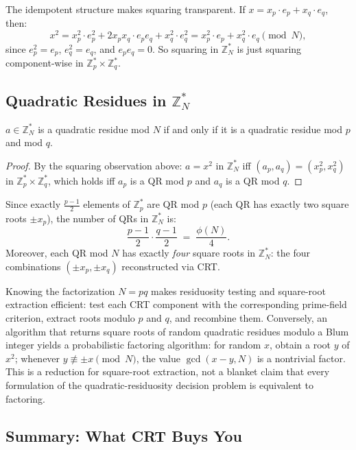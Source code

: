 The idempotent structure makes squaring transparent. If $x = x_p \cdot e_p + x_q \cdot e_q$, then:
\[
    x^2 = x_p^2 \cdot e_p^2 + 2x_p x_q \cdot e_p e_q + x_q^2 \cdot e_q^2
        = x_p^2 \cdot e_p + x_q^2 \cdot e_q \pmod{N},
\]
since $e_p^2 = e_p$, $e_q^2 = e_q$, and $e_p e_q = 0$. So squaring in $\mathbb{Z}_N^*$ is just squaring component-wise in $\mathbb{Z}_p^* \times \mathbb{Z}_q^*$.

\subsection{Quadratic Residues in \texorpdfstring{$\mathbb{Z}_N^*$}{the unit group modulo N}}

\begin{proposition}
    $a \in \mathbb{Z}_N^*$ is a quadratic residue mod $N$ if and only if it is a quadratic residue mod $p$ and mod $q$.
\end{proposition}

\begin{proof}
    By the squaring observation above: $a = x^2$ in $\mathbb{Z}_N^*$ iff $(a_p, a_q) = (x_p^2, x_q^2)$ in $\mathbb{Z}_p^* \times \mathbb{Z}_q^*$, which holds iff $a_p$ is a QR mod $p$ and $a_q$ is a QR mod $q$.
\end{proof}

Since exactly $\frac{p-1}{2}$ elements of $\mathbb{Z}_p^*$ are QR mod $p$ (each QR has exactly two square roots $\pm x_p$), the number of QRs in $\mathbb{Z}_N^*$ is:
\[
    \frac{p-1}{2} \cdot \frac{q-1}{2} \;=\; \frac{\phi(N)}{4}.
\]
Moreover, each QR mod $N$ has exactly \emph{four} square roots in $\mathbb{Z}_N^*$: the four combinations $(\pm x_p, \pm x_q)$ reconstructed via CRT.

Knowing the factorization $N=pq$ makes residuosity testing and square-root extraction efficient: test each CRT component with the corresponding prime-field criterion, extract roots modulo $p$ and $q$, and recombine them. Conversely, an algorithm that returns square roots of random quadratic residues modulo a Blum integer yields a probabilistic factoring algorithm: for random $x$, obtain a root $y$ of $x^2$; whenever $y\not\equiv\pm x\pmod N$, the value $\gcd(x-y,N)$ is a nontrivial factor. This is a reduction for square-root extraction, not a blanket claim that every formulation of the quadratic-residuosity decision problem is equivalent to factoring.

\subsection{Summary: What CRT Buys You}

